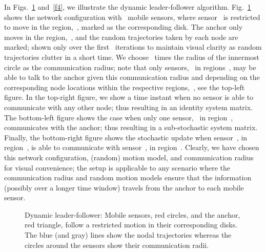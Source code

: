 \documentclass[draftclsnofoot, onecolumn, 12pt]{IEEEtran}
\begin{document}
In Figs.~\ref{f3} and~\ref{f4}, we illustrate the dynamic leader-follower algorithm. Fig.~\ref{f3} shows the network configuration with~ mobile sensors, where sensor~ is restricted to move in the region,~, marked as the corresponding disk. The anchor only moves in the region,~, and the random trajectories taken by each node are marked; shown only over the first~ iterations to maintain visual clarity as random trajectories clutter in a short time. We choose~ times the radius of the innermost circle as the communication radius; note that only sensors,~ in regions~, may be able to talk to the anchor given this communication radius and depending on the corresponding node locations within the respective regions,~, see the top-left figure. In the top-right figure, we show a time instant when no sensor is able to communicate with any other node; thus resulting in an identity system matrix. The bottom-left figure shows the case when only one sensor,~ in region~, communicates with the anchor; thus resulting in a sub-stochastic system matrix. Finally, the bottom-right figure shows the stochastic update when sensor~, in region~, is able to communicate with sensor~, in region~. Clearly, we have chosen this network configuration, (random) motion model, and communication radius for visual convenience; the setup is applicable to any scenario where the communication radius and random motion models ensure that the information (possibly over a longer time window) travels from the anchor to each mobile sensor. 
\begin{figure}[!h]
\centering
{}
\caption{Dynamic leader-follower: Mobile sensors, red circles, and the anchor, red triangle, follow a restricted motion in their corresponding disks. The blue (and gray) lines show the nodal trajectories whereas the circles around the sensors show their communication radii.}
\label{f3}
\end{figure}
\end{document}
